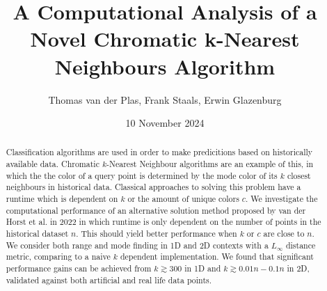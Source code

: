 \documentclass{article}
\title{A Computational Analysis of a Novel Chromatic k-Nearest Neighbours Algorithm}
\author{Thomas van der Plas, Frank Staals, Erwin Glazenburg}
\date{10 November 2024}
\newcommand{\fb}[1]{{\color{blue}#1}}
\begin{document}
\maketitle

\begin{abstract}
    \fb{Classification algorithms are used in order to make predicitions based on historically available data. Chromatic $k$-Nearest Neighbour algorithms are an example of this, in which the} the color of a query point is determined by the mode color of its $k$ closest neighbours \fb{in historical data}. Classical approaches to solving this problem have a runtime which is dependent on $k$ or the amount of unique colors $c$. \fb{We investigate the computational performance of an alternative solution method proposed by van der Horst et al. in 2022 in which runtime is only dependent on the number of points in the historical dataset $n$. This should yield better performance when $k$ or $c$ are close to $n$.}\\
    We consider both range and mode finding in 1D and 2D contexts with a $L_\infty$ distance metric, comparing to a naive $k$ dependent implementation. We found that significant performance gains can be achieved from $k \gtrsim 300$ in 1D and $k \gtrsim 0.01n-0.1n$ in 2D, validated against both artificial and real life data points.
\end{abstract}
\end{document}
